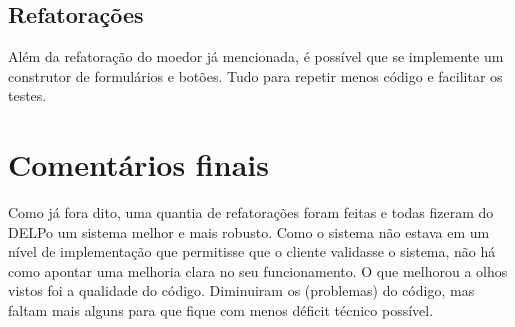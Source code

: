 \subsection{Refatorações}\label{subsec:refatoracoes}

Além da refatoração do moedor já mencionada, é possível que se implemente um construtor de formulários e botões. Tudo
para repetir menos código e facilitar os testes.

\section{Comentários finais} \label{sec:botton-line}

Como já fora dito, uma quantia de refatorações foram feitas e todas fizeram do DELPo um sistema melhor e mais 
robusto. Como o sistema não estava em um nível de implementação que permitisse que o cliente validasse o
sistema, não há como apontar uma melhoria clara no seu funcionamento. O que melhorou a olhos vistos foi a
qualidade do código. Diminuiram os  (problemas) do código, mas faltam mais alguns para que fique
com menos déficit técnico possível.


